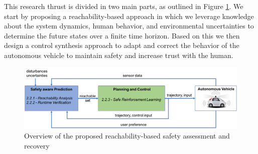 This research thrust is divided in two main parts, as outlined in Figure \ref{fig:reach}. We start by proposing a reachability-based approach in which we leverage knowledge about the system dynamics, human behavior, and environmental uncertainties to determine the future states over a finite time horizon. 
Based on this we then design a control synthesis approach to adapt and correct the behavior of the autonomous vehicle to maintain safety and increase trust with the human.

\begin{figure}
    \centering
    \includegraphics[width=0.8\columnwidth]{figures/reach2.png}
    \caption{Overview of the proposed reachability-based safety assessment and recovery}
    \label{fig:reach}
\end{figure}

%



